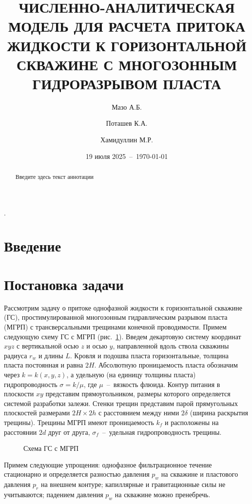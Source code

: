 \documentclass{article}
\title{ЧИСЛЕННО-АНАЛИТИЧЕСКАЯ МОДЕЛЬ ДЛЯ РАСЧЕТА ПРИТОКА ЖИДКОСТИ К ГОРИЗОНТАЛЬНОЙ СКВАЖИНЕ С МНОГОЗОННЫМ ГИДРОРАЗРЫВОМ ПЛАСТА}
\author[1]{Мазо А.Б.}
\author[1]{Поташев К.А.}
\author[2]{Хамидуллин М.Р.}
\affil[1]{Казанский федеральный университет, Казань, Россия}
\affil[2]{Научно-исследовательский центр ``Курчатовский институт''}
\date{19 июля 2025~--~\today}
\begin{document}
\maketitle

\tableofcontents

\listoffigures

\listoftables.

\begin{abstract}
  Введите здесь текст аннотации
\end{abstract}

\section*{Введение}

\section{Постановка задачи}
Рассмотрим задачу о притоке однофазной жидкости к горизонтальной скважине (ГС), простимулированной многозонным гидравлическим разрывом пласта (МГРП) с трансверсальными трещинами конечной проводимости. Примем следующую схему ГС с МГРП (рис.~\ref{fig:kham_main_scheme}).
Введем декартовую систему координат $xyz$ с вертикальной осью $z$ и осью $y$, направленной вдоль ствола скважины радиуса $r_w$ и длины $L$. Кровля и подошва пласта горизонтальные, толщина пласта постоянная и равна $2H$. Абсолютную проницаемость пласта обозначим через $k=k\left(x,y,z\right)$, а удельную (на единицу толщины пласта) гидропроводность $\sigma = k / \mu$, где $\mu$~--~вязкость флюида. Контур питания в плоскости $xy$ представим прямоугольником, размеры которого определяется системой разработки залежи. Стенки трещин представим парой прямугольных плоскостей размерами $2H \times 2h$ с расстоянием между ними $2\delta$ (ширина раскрытия трещины). Трещины МГРП имеют проницаемость $k_f$ и расположены на расстоянии $2d$ друг от друга, $\sigma_f$~--~удельная гидропроводность трещины.

\begin{figure}[!ht]
  \centering
  
  \caption{\label{fig:kham_main_scheme}Схема ГС с МГРП}
\end{figure}

Примем следующие упрощения: однофазное фильтрационное течение стационарно и определяется разностью давления $p_w$ на скважине и пластового давления $p_r$ на внешнем контуре; капиллярные и гравитационные силы не учитываются; падением давления $p_w$ на скважине можно пренебречь.
\end{document}
